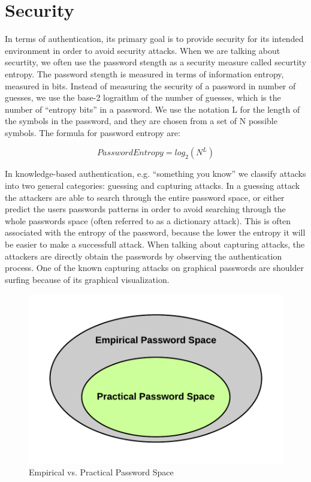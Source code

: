 
\section{Security}

  In terms of authentication, its primary goal is to provide security for its intended environment in order to avoid security attacks. When we are talking about securtity, we often use the password stength as a security measure called securtity entropy. The password stength is measured in terms of information entropy, measured in bits. Instead of measuring the security of a password in number of guesses, we use the base-2 lograithm of the number of guesses, which is the number of ``entropy bits'' in a password. We use the notation L for the length of the symbols in the password, and they are chosen from a set of N possible symbols. The formula for password entropy are:
  
  \begin{equation}
    Password Entropy = log_{2}(N^{L})
  \end{equation}

  In knowledge-based authentication, e.g. ``something you know'' we classify attacks into two general categories: guessing and capturing attacks. In a guessing attack the attackers are able to search through the entire password space, or either predict the users passwords patterns in order to avoid searching through the whole passwords space (often referred to as a dictionary attack). This is often associated with the entropy of the password, because the lower the entropy it will be easier to make a successfull attack. 
  When talking about capturing attacks, the attackers are directly obtain the passwords by observing the authentication process. One of the known capturing attacks on graphical passwords are shoulder surfing because of its graphical visualization.  

  \begin{figure}
    \vspace{-20pt}
    \begin{center}
      \includegraphics[scale=0.16]{pics/EmpiricalVsPractical.png}
    \end{center}
    \vspace{-20pt}
    \caption{Empirical vs. Practical Password Space}
    \vspace{0pt}
  \end{figure}

